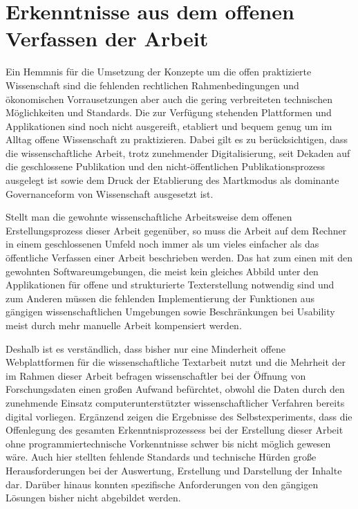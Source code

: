 \section{Erkenntnisse aus dem offenen Verfassen der Arbeit}

Ein Hemmnis für die Umsetzung der Konzepte um die offen praktizierte Wissenschaft sind die fehlenden rechtlichen Rahmenbedingungen und ökonomischen Vorrausetzungen aber auch die gering verbreiteten technischen Möglichkeiten und Standards. Die zur Verfügung stehenden Plattformen und Applikationen sind noch nicht ausgereift, etabliert und bequem genug um im Alltag offene Wissenschaft zu praktizieren. Dabei gilt es zu berücksichtigen, dass die wissenschaftliche Arbeit, trotz zunehmender Digitalisierung, seit Dekaden auf die geschlossene Publikation und den nicht-öffentlichen Publikationsprozess ausgelegt ist sowie dem Druck der Etablierung des Martkmodus als dominante Governanceform von Wissenschaft ausgesetzt ist.

Stellt man die gewohnte wissenschaftliche Arbeitsweise dem offenen Erstellungsprozess dieser Arbeit gegenüber, so muss die Arbeit auf dem Rechner in einem geschlossenen Umfeld noch immer als um vieles einfacher als das öffentliche Verfassen einer Arbeit beschrieben werden. Das hat zum einen mit den gewohnten Softwareumgebungen, die meist kein gleiches Abbild unter den Applikationen für offene und  strukturierte Texterstellung notwendig sind und zum Anderen müssen die fehlenden Implementierung der Funktionen aus gängigen wissenschaftlichen Umgebungen sowie Beschränkungen bei Usability meist durch mehr manuelle Arbeit kompensiert werden.

Deshalb ist es verständlich, dass bisher nur eine Minderheit offene Webplattformen für die wissenschaftliche Textarbeit \cite{Perkel_2014} nutzt und die Mehrheit der im Rahmen dieser Arbeit befragen wissenschaftler bei der Öffnung von Forschungsdaten einen großen Aufwand befürchtet, obwohl die Daten durch den zunehmende Einsatz computerunterstützter wissenschaftlicher Verfahren bereits digital vorliegen. Ergänzend zeigen die Ergebnisse des Selbstexperiments, dass die Offenlegung des gesamten Erkenntnisprozessess bei der Erstellung dieser Arbeit ohne programmiertechnische Vorkenntnisse schwer bis nicht möglich gewesen wäre. Auch hier stellten fehlende Standards und technische Hürden große Herausforderungen bei der Auswertung, Erstellung und Darstellung der Inhalte dar. Darüber hinaus konnten spezifische Anforderungen von den gängigen Lösungen bisher nicht abgebildet werden.

